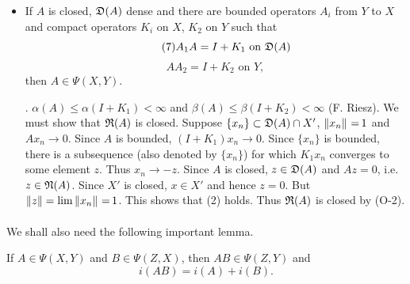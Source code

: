 \documentclass[11pt,twoside]{article}
\begin{document}
\begin{itemize}[leftmargin=12mm]
\item[(O-5)]
If $A$ is closed, $\mathfrak{D}(A)$ dense and there are bounded
operators $A_i$ from $Y$ to $X$ and compact operators $K_i$ on $X$,
$K_2$ on $Y$
such that
\begin{equation}\tag{7}
A_1 A = I + K_1 \mbox{ on } \mathfrak{D}(A)
\end{equation}
\begin{equation}\tag{8}
A A_2 = I + K_2 \mbox{ on } Y,
\end{equation}
then $A \in \Psi(X,Y)$.

\vspace{3mm}

\Proof.
$\alpha(A) \leq \alpha(I + K_1) < \infty$ and
$\beta(A)  \leq \beta(I + K_2)  < \infty$
(F. Riesz).
We must show that $\mathfrak{R}(A)$ is closed.
Suppose $\{x_n\} \subset \mathfrak{D}(A) \cap X'$,
$\left\lVert x_n \right\rVert {\,=\,} 1$ and $A x_n \to 0$.
Since $A$ is bounded,
$(I + K_1)x_n \to 0$.
Since $\{x_n\}$ is bounded,
there is a subsequence (also denoted by $\{x_n\}$)
for which $K_1 x_n$ converges to some element $z$.
Thus $x_n \to -z$.
Since $A$ is closed, $z \in \mathfrak{D}(A)$ and $Az = 0$,
i.e. $z \in \mathfrak{N}(A)$.
Since $X'$ is closed, $x \in X'$ and hence $z = 0$.
But $\left\lVert z \right\rVert = \lim \left\lVert x_n \right\rVert {\,=\,} 1$.
This shows that (2) holds.
Thus $\mathfrak{R}(A)$ is closed by (O-2).
\end{itemize}

\paragraph*{}
We shall also need the following important lemma.

\begin{lemma} %
If $A \in \Psi(X,Y)$ and $B \in \Psi(Z,X)$, then $AB \in \Psi(Z,Y)$ and
\begin{equation}\tag{9}
i(AB) = i(A) + i(B) .
\end{equation}
\end{lemma}
\end{document}
